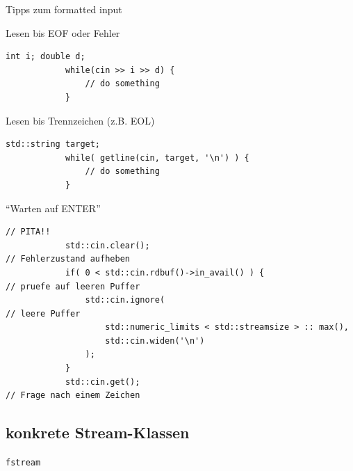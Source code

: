 \begin{frame}[fragile]{Tipps zum formatted input}
	\footnotesize
	
	\begin{block}{\footnotesize Lesen bis EOF oder Fehler}
		\vspace{-0.5em}
		\begin{lstlisting}[basicstyle=\tiny]
			int i; double d;
			while(cin >> i >> d) {
			    // do something
			}
		\end{lstlisting}
		\vspace{-0.5em}
	\end{block}
	
	\pause
	
	\begin{block}{\footnotesize Lesen bis Trennzeichen (z.B. EOL)}
		\vspace{-0.5em}
		\begin{lstlisting}[basicstyle=\tiny]
			std::string target;
			while( getline(cin, target, '\n') ) {
			    // do something
			}
		\end{lstlisting}
		\vspace{-0.5em}
	\end{block}
	
	\pause
	
	\begin{block}{\footnotesize \enquote{Warten auf ENTER}}
		\vspace{-0.5em}
		\begin{lstlisting}[basicstyle=\tiny]
			// PITA!!
			std::cin.clear();                                            // Fehlerzustand aufheben
			if( 0 < std::cin.rdbuf()->in_avail() ) {                     // pruefe auf leeren Puffer
			    std::cin.ignore(                                         // leere Puffer
			        std::numeric_limits < std::streamsize > :: max(),
			        std::cin.widen('\n')
			    );
			}
			std::cin.get();                                              // Frage nach einem Zeichen
		\end{lstlisting}
		\vspace{-0.5em}
	\end{block}
\end{frame}


\subsection{konkrete Stream-Klassen}

\begin{frame}{\texttt{fstream}}
\end{frame}


